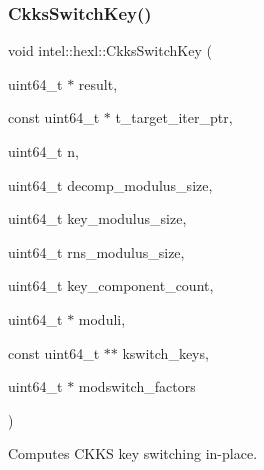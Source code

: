 \subsubsection{\texorpdfstring{Ckks\+Switch\+Key()}{CkksSwitchKey()}}
{\footnotesize\ttfamily void intel\+::hexl\+::\+Ckks\+Switch\+Key (\begin{DoxyParamCaption}\item[{uint64\+\_\+t $\ast$}]{result,  }\item[{const uint64\+\_\+t $\ast$}]{t\+\_\+target\+\_\+iter\+\_\+ptr,  }\item[{uint64\+\_\+t}]{n,  }\item[{uint64\+\_\+t}]{decomp\+\_\+modulus\+\_\+size,  }\item[{uint64\+\_\+t}]{key\+\_\+modulus\+\_\+size,  }\item[{uint64\+\_\+t}]{rns\+\_\+modulus\+\_\+size,  }\item[{uint64\+\_\+t}]{key\+\_\+component\+\_\+count,  }\item[{uint64\+\_\+t $\ast$}]{moduli,  }\item[{const uint64\+\_\+t $\ast$$\ast$}]{kswitch\+\_\+keys,  }\item[{uint64\+\_\+t $\ast$}]{modswitch\+\_\+factors }\end{DoxyParamCaption})}



Computes C\+K\+KS key switching in-\/place. 


